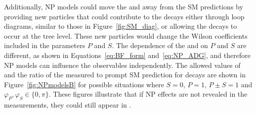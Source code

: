 Additionally, NP models could move the \BFs and \ADG away from the SM predictions by providing new particles that could contribute to the decays either through loop diagrams, similar to those in Figure~\ref{fig:SM_diag}, or allowing the decays to occur at the tree level. These new particles would change the Wilson coefficients included in the parameters $P$ and $S$. The dependence of the \BFs and \ADG on $P$ and $S$ are different, as shown in Equations~\ref{eq:BF_form} and~\ref{eq:NP_ADG}, and therefore NP models can influence the observables independently. The allowed values of \ADG and the ratio of the measured \BF to prompt SM prediction for \bsmumu decays are shown in Figure~\ref{fig:NPmodelsB} for possible situations where $S=0$, $P=1$, $P\pm S = 1$ and $\varphi_P, \varphi_S \in \{0, \pi\}$. These figures illustrate that if NP effects are not revealed in the \BF measurements, they could still appear in \ADG. 

